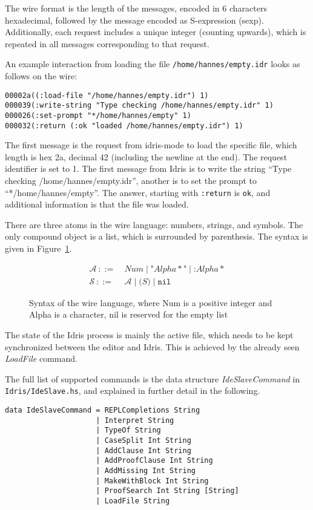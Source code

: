 \documentclass{article}
\begin{document}
The wire format is the length of the messages, encoded in 6 characters hexadecimal, followed by the message encoded as S-expression (sexp).
Additionally, each request includes a unique integer (counting upwards), which is repeated in all messages corresponding to that request.

An example interaction from loading the file \texttt{/home/hannes/empty.idr} looks as follows on the wire:
\begin{verbatim}
00002a((:load-file "/home/hannes/empty.idr") 1)
000039(:write-string "Type checking /home/hannes/empty.idr" 1)
000026(:set-prompt "*/home/hannes/empty" 1)
000032(:return (:ok "loaded /home/hannes/empty.idr") 1)
\end{verbatim}

The first message is the request from idris-mode to load the specific file, which length is hex 2a, decimal 42 (including the newline at the end).
The request identifier is set to 1.
The first message from Idris is to write the string ``Type checking /home/hannes/empty.idr'', another is to set the prompt to ``*/home/hannes/empty''.
The answer, starting with \texttt{:return} is \texttt{ok}, and additional information is that the file was loaded.

There are three atoms in the wire language: numbers, strings, and symbols.
The only compound object is a list, which is surrounded by parenthesis.
The syntax is given in Figure~\ref{fig:syntax}.

\begin{figure}
\centering
\begin{align*}
\mathcal{A}{~::=~}&\mathit{Num} \mid \texttt{"} \mathit{Alpha*} \texttt{"} \mid \texttt{:}\mathit{Alpha*}\\
\mathcal{S}{~::=~}&\mathcal{A} \mid \texttt{(} S \texttt{)} \mid \texttt{nil}
\end{align*}
\caption{Syntax of the wire language, where Num is a positive integer and Alpha is a character, nil is reserved for the empty list}
\label{fig:syntax}
\end{figure}

The state of the Idris process is mainly the active file, which needs to be kept synchronized between the editor and Idris.
This is achieved by the already seen \emph{LoadFile} command.

The full list of supported commands is the data structure \emph{IdeSlaveCommand} in \texttt{Idris/IdeSlave.hs}, and explained in further detail in the following.

\begin{verbatim}
data IdeSlaveCommand = REPLCompletions String
                     | Interpret String
                     | TypeOf String
                     | CaseSplit Int String
                     | AddClause Int String
                     | AddProofClause Int String
                     | AddMissing Int String
                     | MakeWithBlock Int String
                     | ProofSearch Int String [String]
                     | LoadFile String
\end{verbatim}
\end{document}
